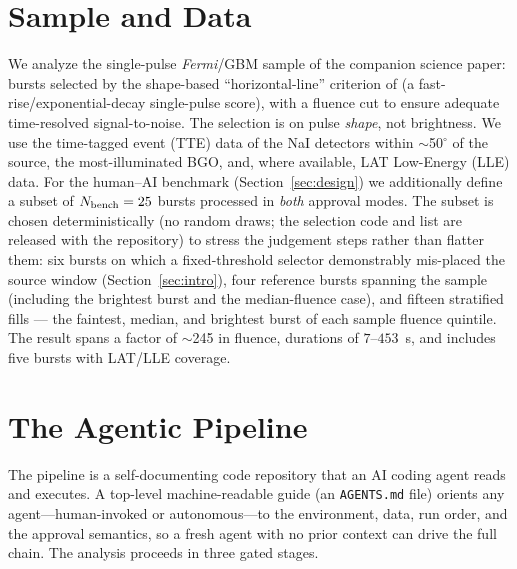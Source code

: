 \documentclass[twocolumn]{aastex631}
\begin{document}
\section{Sample and Data} \label{sec:sample}
We analyze the single-pulse \textit{Fermi}/GBM sample of the companion science
paper: bursts selected by the shape-based ``horizontal-line'' criterion of
\citet{Busby2024} (a fast-rise/exponential-decay single-pulse score), with a
fluence cut to ensure adequate time-resolved signal-to-noise. The selection is on
pulse \emph{shape}, not brightness. We use the time-tagged event (TTE) data of the
NaI detectors within $\sim$50$^\circ$ of the source, the most-illuminated BGO, and,
where available, LAT Low-Energy (LLE) data. For the human--AI benchmark
(Section~\ref{sec:design}) we additionally define a subset of $N_{\rm bench}=25$
bursts processed in \emph{both} approval modes. The subset is chosen
deterministically (no random draws; the selection code and list are released with
the repository) to stress the judgement steps rather than flatter them: six bursts
on which a fixed-threshold selector demonstrably mis-placed the source window
(Section~\ref{sec:intro}), four reference bursts spanning the sample (including the
brightest burst and the median-fluence case), and fifteen stratified fills --- the
faintest, median, and brightest burst of each sample fluence quintile. The result
spans a factor of $\sim$245 in fluence, durations of $7$--$453$~s, and includes
five bursts with LAT/LLE coverage.

\section{The Agentic Pipeline} \label{sec:pipeline}
The pipeline is a self-documenting code repository that an AI coding agent reads
and executes. A top-level machine-readable guide (an \texttt{AGENTS.md} file)
orients any agent---human-invoked or autonomous---to the environment, data, run
order, and the approval semantics, so a fresh agent with no prior context can drive
the full chain. The analysis proceeds in three gated stages.
\end{document}
